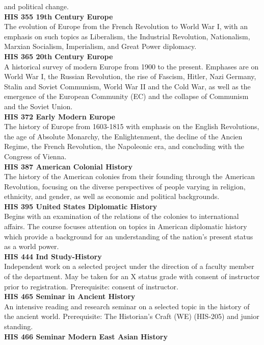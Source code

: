 \documentclass[
  letterpaper,
]{scrbook}
\begin{document}
and political change.\\
\textbf{HIS 355 19th Century Europe}\\
The evolution of Europe from the French Revolution to World War I, with
an emphasis on such topics as Liberalism, the Industrial Revolution,
Nationalism, Marxian Socialism, Imperialism, and Great Power
diplomacy.\\
\textbf{HIS 365 20th Century Europe}\\
A historical survey of modern Europe from 1900 to the present. Emphases
are on World War I, the Russian Revolution, the rise of Fascism, Hitler,
Nazi Germany, Stalin and Soviet Communism, World War II and the Cold
War, as well as the emergence of the European Community (EC) and the
collapse of Communism and the Soviet Union.\\
\textbf{HIS 372 Early Modern Europe}\\
The history of Europe from 1603-1815 with emphasis on the English
Revolutions, the age of Absolute Monarchy, the Enlightenment, the
decline of the Ancien Regime, the French Revolution, the Napoleonic era,
and concluding with the Congress of Vienna.\\
\textbf{HIS 387 American Colonial History}\\
The history of the American colonies from their founding through the
American Revolution, focusing on the diverse perspectives of people
varying in religion, ethnicity, and gender, as well as economic and
political backgrounds.\\
\textbf{HIS 395 United States Diplomatic History}\\
Begins with an examination of the relations of the colonies to
international affairs. The course focuses attention on topics in
American diplomatic history which provide a background for an
understanding of the nation's present status as a world power.\\
\textbf{HIS 444 Ind Study-History}\\
Independent work on a selected project under the direction of a faculty
member of the department. May be taken for an X status grade with
consent of instructor prior to registration. Prerequisite: consent of
instructor.\\
\textbf{HIS 465 Seminar in Ancient History}\\
An intensive reading and research seminar on a selected topic in the
history of the ancient world. Prerequisite: The Historian's Craft (WE)
(HIS-205) and junior standing.\\
\textbf{HIS 466 Seminar Modern East Asian History}\\
\end{document}
